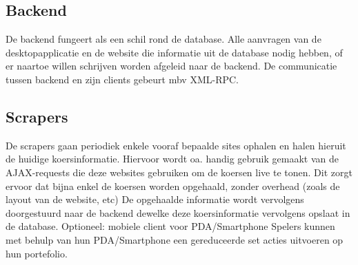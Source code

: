 \subsection{Backend}

De backend fungeert als een schil rond de database. Alle aanvragen van de desktopapplicatie en de website die informatie uit de database nodig hebben, of er naartoe willen schrijven worden afgeleid naar de backend. De communicatie tussen backend en zijn clients gebeurt mbv XML-RPC. 

\subsection{Scrapers}

De scrapers gaan periodiek enkele vooraf bepaalde sites ophalen en halen hieruit de huidige koersinformatie. Hiervoor wordt oa. handig gebruik gemaakt van de AJAX-requests die deze websites gebruiken om de koersen live te tonen. Dit zorgt ervoor dat bijna enkel de koersen worden opgehaald, zonder overhead (zoals de layout van de website, etc) 
De opgehaalde informatie wordt vervolgens doorgestuurd naar de backend dewelke deze koersinformatie vervolgens opslaat in de database. 
Optioneel: mobiele client voor PDA/Smartphone 
Spelers kunnen met behulp van hun PDA/Smartphone een gereduceerde set acties uitvoeren op hun portefolio.

